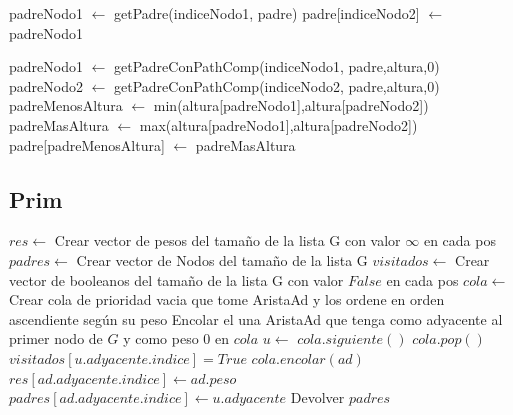 \documentclass[11pt,a4paper]{article}
\begin{document}
\begin{codebox}
	\li padreNodo1 $\gets$ getPadre(indiceNodo1, padre)
	\li padre[indiceNodo2] $\gets$ padreNodo1
\end{codebox}

\begin{codebox}
\li padreNodo1 $\gets$ getPadreConPathComp(indiceNodo1, padre,altura,0)
\li padreNodo2 $\gets$ getPadreConPathComp(indiceNodo2, padre,altura,0)
\li padreMenosAltura $\gets$ min(altura[padreNodo1],altura[padreNodo2])
\li padreMasAltura $\gets$ max(altura[padreNodo1],altura[padreNodo2])
\li padre[padreMenosAltura] $\gets$ padreMasAltura
\end{codebox}

\subsection{Prim}

\begin{codebox}
\li $res \gets$ Crear vector de pesos del tamaño de la lista G con valor $\infty$ en cada pos
\li $padres \gets$ Crear vector de Nodos del tamaño de la lista G
\li $visitados \gets$ Crear vector de booleanos del tamaño de la lista G con valor $False$ en cada pos
\li $cola \gets$ Crear cola de prioridad vacia que tome AristaAd 
\zi y los ordene en orden ascendiente según su peso
\li Encolar el una AristaAd que tenga como adyacente al primer nodo de $G$ y como peso $0$ en $cola$
\li {} \Do
\li 	$u \gets$ $cola.siguiente()$
\li 	$cola.pop()$
\li 	$visitados[u.adyacente.indice] = True$
\li 	{} \Do
\li 		{} \Then
			\li $cola.encolar(ad)$
\li 			{} \Then
					\li $res[ad.adyacente.indice] \gets ad.peso$
					\li $padres[ad.adyacente.indice] \gets u.adyacente$
				\End
			 \End
		\End
	\End
\li Devolver $padres$
\end{codebox}
\end{document}
